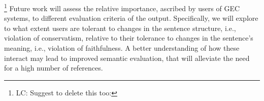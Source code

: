 \documentclass[letterpaper, 11pt]{article}
\newcommand{\lc}[1]{\footnote{\color{blue}LC: #1}}
\begin{document}
%
%
%
\lc{Suggest to delete this too:}
Future work will assess the relative importance, ascribed by users of GEC systems,
to different evaluation criteria of the output.
Specifically, we will explore to what extent users are
tolerant to changes in the sentence structure, i.e.,
violation of conservatism, relative to their tolerance to changes in the sentence's meaning,
i.e., violation of faithfulness.
A better understanding of how these interact
may lead to improved semantic evaluation, that will alleviate the need
for a high number of references.





\pagebreak
\appendix
\end{document}
